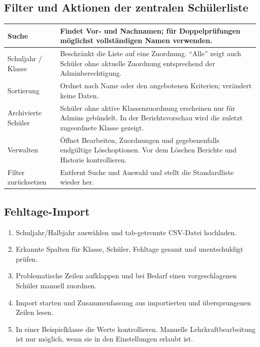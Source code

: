 \documentclass[12pt,a4paper]{article}
\begin{document}
\subsection*{Filter und Aktionen der zentralen Schülerliste}
\begin{tabularx}{\textwidth}{|p{}|X|}
\hline
Suche & Findet Vor- und Nachnamen; für Doppelprüfungen möglichst vollständigen Namen verwenden.\\
\hline
Schuljahr / Klasse & Beschränkt die Liste auf eine Zuordnung. \enquote{Alle} zeigt auch Schüler ohne aktuelle Zuordnung entsprechend der Adminberechtigung.\\
\hline
Sortierung & Ordnet nach Name oder den angebotenen Kriterien; verändert keine Daten.\\
\hline
Archivierte Schüler & Schüler ohne aktive Klassenzuordnung erscheinen nur für Admins gebündelt. In der Berichtsvorschau wird die zuletzt zugeordnete Klasse gezeigt.\\
\hline
Verwalten & Öffnet Bearbeiten, Zuordnungen und gegebenenfalls endgültige Löschoptionen. Vor dem Löschen Berichte und Historie kontrollieren.\\
\hline
Filter zurücksetzen & Entfernt Suche und Auswahl und stellt die Standardliste wieder her.\\
\hline
\end{tabularx}

\subsection*{Fehltage-Import}
\begin{enumerate}
  \item Schuljahr/Halbjahr auswählen und tab-getrennte CSV-Datei hochladen.
  \item Erkannte Spalten für Klasse, Schüler, Fehltage gesamt und unentschuldigt prüfen.
  \item Problematische Zeilen aufklappen und bei Bedarf einen vorgeschlagenen Schüler manuell zuordnen.
  \item Import starten und Zusammenfassung aus importierten und übersprungenen Zeilen lesen.
  \item In einer Beispielklasse die Werte kontrollieren. Manuelle Lehrkraftbearbeitung ist nur möglich, wenn sie in den Einstellungen erlaubt ist.
\end{enumerate}
\end{document}
